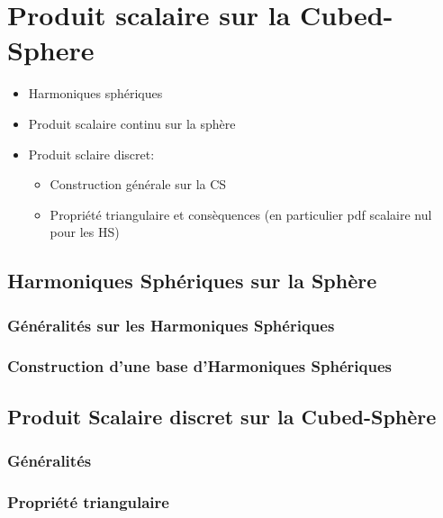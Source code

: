 \section{Produit scalaire sur la Cubed-Sphere}

\begin{itemize}
\item Harmoniques sphériques
\item Produit scalaire continu sur la sphère
\item Produit sclaire discret:
\begin{itemize}
\item Construction générale sur la CS
\item Propriété triangulaire et consèquences (en particulier pdf scalaire nul pour les HS)
\end{itemize}
\end{itemize}

\subsection{Harmoniques Sphériques sur la Sphère}

\subsubsection{Généralités sur les Harmoniques Sphériques}

\subsubsection{Construction d'une base d'Harmoniques Sphériques}

\subsection{Produit Scalaire discret sur la Cubed-Sphère}

\subsubsection{Généralités}

\subsubsection{Propriété triangulaire}













